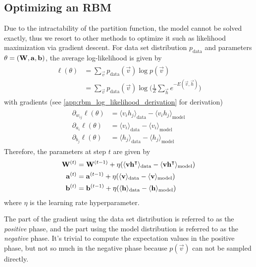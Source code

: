 \subsection{Optimizing an RBM}
Due to the intractability of the partition function, the model cannot be solved exactly, thus we resort to other methods to optimize it such as likelihood maximization via gradient descent.
For data set distribution \( p_\text{data} \) and parameters \( \theta = (\mathbf{W}, \mathbf{a}, \mathbf{b}) \), the average log-likelihood is given by
\begin{align}
\begin{split}
    \ell(\theta)
        &= \sum_{\vec{v}} p_{\text{data}}(\vec{v}) \log p(\vec{v}) \\
        &= \sum_{\vec{v}} p_{\text{data}}(\vec{v}) \log \bigg(\frac{1}{Z} \sum_\vec{h} e^{-E(\vec{v},\vec{h})}\bigg)
\end{split}
\end{align}
with gradients (see \cref{app:rbm_log_likelihood_derivation} for derivation)
\begin{align}
\begin{split}
    \partial_{w_{ij}} \ell(\theta)
        &= \langle v_i h_j \rangle_{\text{data}} - \langle v_i h_j \rangle_{\text{model}} \\
    \partial_{a_i} \ell(\theta)
        &= \langle v_i \rangle_{\text{data}} - \langle v_i \rangle_{\text{model}} \\
    \partial_{b_j} \ell(\theta)
        &= \langle h_j \rangle_{\text{data}} - \langle h_j \rangle_{\text{model}}
\end{split}
\end{align}
Therefore, the parameters at step \( t \) are given by
\begin{align}
\begin{split}
    \mathbf{W}^{(t)}
        &= \mathbf{W}^{(t-1)} + \eta(\langle \mathbf{v} \mathbf{h}^\intercal \rangle_{\text{data}} - \langle \mathbf{v} \mathbf{h}^\intercal \rangle_{\text{model}}) \\
    \mathbf{a}^{(t)}
        &= \mathbf{a}^{(t-1)} + \eta(\langle \mathbf{v} \rangle_{\text{data}} - \langle \mathbf{v} \rangle_{\text{model}}) \\
    \mathbf{b}^{(t)}
        &= \mathbf{b}^{(t-1)} + \eta(\langle \mathbf{h} \rangle_{\text{data}} - \langle \mathbf{h} \rangle_{\text{model}})
\end{split}
\end{align}
where \( \eta \) is the learning rate hyperparameter.

The part of the gradient using the data set distribution is referred to as the \textit{positive} phase, and the part using the model distribution is referred to as the \textit{negative} phase.
It's trivial to compute the expectation values in the positive phase, but not so much in the negative phase because \( p(\vec{v}) \) can not be sampled directly.


